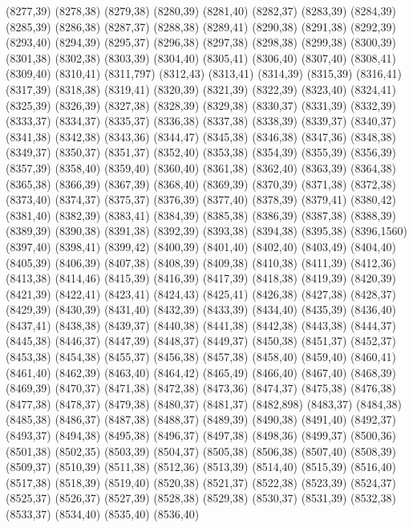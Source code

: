 (8277,39)
(8278,38)
(8279,38)
(8280,39)
(8281,40)
(8282,37)
(8283,39)
(8284,39)
(8285,39)
(8286,38)
(8287,37)
(8288,38)
(8289,41)
(8290,38)
(8291,38)
(8292,39)
(8293,40)
(8294,39)
(8295,37)
(8296,38)
(8297,38)
(8298,38)
(8299,38)
(8300,39)
(8301,38)
(8302,38)
(8303,39)
(8304,40)
(8305,41)
(8306,40)
(8307,40)
(8308,41)
(8309,40)
(8310,41)
(8311,797)
(8312,43)
(8313,41)
(8314,39)
(8315,39)
(8316,41)
(8317,39)
(8318,38)
(8319,41)
(8320,39)
(8321,39)
(8322,39)
(8323,40)
(8324,41)
(8325,39)
(8326,39)
(8327,38)
(8328,39)
(8329,38)
(8330,37)
(8331,39)
(8332,39)
(8333,37)
(8334,37)
(8335,37)
(8336,38)
(8337,38)
(8338,39)
(8339,37)
(8340,37)
(8341,38)
(8342,38)
(8343,36)
(8344,47)
(8345,38)
(8346,38)
(8347,36)
(8348,38)
(8349,37)
(8350,37)
(8351,37)
(8352,40)
(8353,38)
(8354,39)
(8355,39)
(8356,39)
(8357,39)
(8358,40)
(8359,40)
(8360,40)
(8361,38)
(8362,40)
(8363,39)
(8364,38)
(8365,38)
(8366,39)
(8367,39)
(8368,40)
(8369,39)
(8370,39)
(8371,38)
(8372,38)
(8373,40)
(8374,37)
(8375,37)
(8376,39)
(8377,40)
(8378,39)
(8379,41)
(8380,42)
(8381,40)
(8382,39)
(8383,41)
(8384,39)
(8385,38)
(8386,39)
(8387,38)
(8388,39)
(8389,39)
(8390,38)
(8391,38)
(8392,39)
(8393,38)
(8394,38)
(8395,38)
(8396,1560)
(8397,40)
(8398,41)
(8399,42)
(8400,39)
(8401,40)
(8402,40)
(8403,49)
(8404,40)
(8405,39)
(8406,39)
(8407,38)
(8408,39)
(8409,38)
(8410,38)
(8411,39)
(8412,36)
(8413,38)
(8414,46)
(8415,39)
(8416,39)
(8417,39)
(8418,38)
(8419,39)
(8420,39)
(8421,39)
(8422,41)
(8423,41)
(8424,43)
(8425,41)
(8426,38)
(8427,38)
(8428,37)
(8429,39)
(8430,39)
(8431,40)
(8432,39)
(8433,39)
(8434,40)
(8435,39)
(8436,40)
(8437,41)
(8438,38)
(8439,37)
(8440,38)
(8441,38)
(8442,38)
(8443,38)
(8444,37)
(8445,38)
(8446,37)
(8447,39)
(8448,37)
(8449,37)
(8450,38)
(8451,37)
(8452,37)
(8453,38)
(8454,38)
(8455,37)
(8456,38)
(8457,38)
(8458,40)
(8459,40)
(8460,41)
(8461,40)
(8462,39)
(8463,40)
(8464,42)
(8465,49)
(8466,40)
(8467,40)
(8468,39)
(8469,39)
(8470,37)
(8471,38)
(8472,38)
(8473,36)
(8474,37)
(8475,38)
(8476,38)
(8477,38)
(8478,37)
(8479,38)
(8480,37)
(8481,37)
(8482,898)
(8483,37)
(8484,38)
(8485,38)
(8486,37)
(8487,38)
(8488,37)
(8489,39)
(8490,38)
(8491,40)
(8492,37)
(8493,37)
(8494,38)
(8495,38)
(8496,37)
(8497,38)
(8498,36)
(8499,37)
(8500,36)
(8501,38)
(8502,35)
(8503,39)
(8504,37)
(8505,38)
(8506,38)
(8507,40)
(8508,39)
(8509,37)
(8510,39)
(8511,38)
(8512,36)
(8513,39)
(8514,40)
(8515,39)
(8516,40)
(8517,38)
(8518,39)
(8519,40)
(8520,38)
(8521,37)
(8522,38)
(8523,39)
(8524,37)
(8525,37)
(8526,37)
(8527,39)
(8528,38)
(8529,38)
(8530,37)
(8531,39)
(8532,38)
(8533,37)
(8534,40)
(8535,40)
(8536,40)

